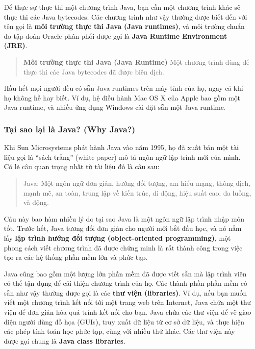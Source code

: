 Để thực sự thực thi một chương trình Java, bạn cần một chương trình khác
sẽ thực thi các Java bytecodes. Các chương trình như vậy thường được
biết đến với tên gọi là \textbf{môi trường thực thi Java (Java
runtimes)}, và môi trường chuẩn do tập đoàn Oracle phân phối được gọi là
\textbf{Java Runtime Environment (JRE)}.

\begin{quote}
\textbf{Môi trường thực thi Java (Java Runtime)} Một chương trình dùng
để thực thi các Java bytecodes đã được biên dịch.
\end{quote}

Hầu hết mọi người đều có sẵn Java runtimes trên máy tính của họ, ngay cả
khi họ không hề hay biết. Ví dụ, hệ điều hành Mac OS X của Apple bao gồm
một Java runtime, và nhiều ứng dụng Windows cài đặt sẵn một Java
runtime.

\subsubsection{Tại sao lại là Java? (Why
Java?)}\label{tux1ea1i-sao-lux1ea1i-luxe0-java-why-java}

Khi Sun Microsystems phát hành Java vào năm 1995, họ đã xuất bản một tài
liệu gọi là ``sách trắng'' (white paper) mô tả ngôn ngữ lập trình mới
của mình. Có lẽ câu quan trọng nhất từ tài liệu đó là câu sau:

\begin{quote}
Java: Một ngôn ngữ đơn giản, hướng đối tượng, am hiểu mạng, thông dịch,
mạnh mẽ, an toàn, trung lập về kiến trúc, di động, hiệu suất cao, đa
luồng, và động.
\end{quote}

Câu này bao hàm nhiều lý do tại sao Java là một ngôn ngữ lập trình nhập
môn tốt. Trước hết, Java tương đối đơn giản cho người mới bắt đầu học,
và nó nắm lấy \textbf{lập trình hướng đối tượng (object-oriented
programming)}, một phong cách viết chương trình đã được chứng minh là
rất thành công trong việc tạo ra các hệ thống phần mềm lớn và phức tạp.

Java cũng bao gồm một lượng lớn phần mềm đã được viết sẵn mà lập trình
viên có thể tận dụng để cải thiện chương trình của họ. Các thành phần
phần mềm có sẵn như vậy thường được gọi là các \textbf{thư viện
(libraries)}. Ví dụ, nếu bạn muốn viết một chương trình kết nối tới một
trang web trên Internet, Java chứa một thư viện để đơn giản hóa quá
trình kết nối cho bạn. Java chứa các thư viện để vẽ giao diện người dùng
đồ họa (GUIs), truy xuất dữ liệu từ cơ sở dữ liệu, và thực hiện các phép
tính toán học phức tạp, cùng với nhiều thứ khác. Các thư viện này được
gọi chung là \textbf{Java class libraries}.

